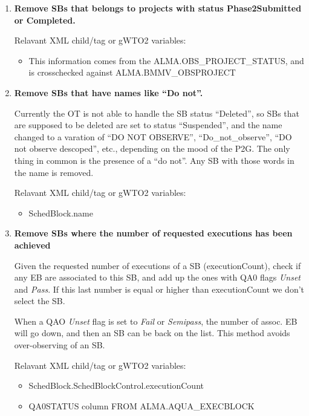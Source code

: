 \documentclass[a4paper,10pt,english]{sphinxmanual}
\begin{document}
\begin{enumerate}
\item {} 
\textbf{Remove SBs that belongs to projects with status Phase2Submitted or Completed.}

Relavant XML child/tag or gWTO2 variables:
\begin{itemize}
\item {} 
This information comes from the ALMA.OBS\_PROJECT\_STATUS, and is crosschecked
against ALMA.BMMV\_OBSPROJECT

\end{itemize}

\item {} 
\textbf{Remove SBs that have names like ``Do not''.}

Currently the OT is not able to handle the SB status ``Deleted'', so SBs
that are supposed to be deleted are set to status ``Suspended'', and the
name changed to a varation of ``DO NOT OBSERVE'', ``Do\_not\_observe'', ``DO not
observe descoped'', etc., depending on the mood of the P2G. The only thing
in common is the presence of a ``do not''. Any SB with those words in the name
is removed.

Relavant XML child/tag or gWTO2 variables:
\begin{itemize}
\item {} 
SchedBlock.name

\end{itemize}

\item {} 
\textbf{Remove SBs where the number of requested executions has been achieved}

Given the requested number of executions of a SB (executionCount), check
if any EB are associated to this SB, and add up the ones with QA0 flags
\emph{Unset} and \emph{Pass}. If this last number is equal or higher than
executionCount we don't select the SB.

When a QAO \emph{Unset} flag is set to \emph{Fail} or \emph{Semipass}, the number of
assoc. EB will go down, and then an SB can be back on the list. This method
avoids over-observing of an SB.

Relavant XML child/tag or gWTO2 variables:
\begin{itemize}
\item {} 
SchedBlock.SchedBlockControl.executionCount

\item {} 
QA0STATUS column FROM ALMA.AQUA\_EXECBLOCK

\end{itemize}


\end{enumerate}
\end{document}
